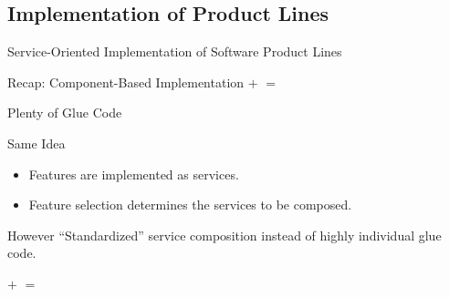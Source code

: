 \subsection{Implementation of Product Lines}
\begin{frame}{Service-Oriented Implementation of Software Product Lines}
	\begin{mycolumns}[widths={40,60},animation=none]
		\begin{example}{Recap: Component-Based Implementation}
				\vspace*{\fill}
					$+$ 
				\vspace*{\fill}	
				\vspace*{\fill}
					$=$ 
				\vspace*{\fill}	
		\end{example}	
		\begin{example}{Plenty of Glue Code}
			\centering
		\end{example}
	\mynextcolumn
		\pause
		\begin{definition}{Same Idea}
			\begin{itemize}
				\item Features are implemented as services.
				\item Feature selection determines the services to be composed.
			\end{itemize}
		\end{definition}
		\pause
		\begin{note}{However}
			``Standardized'' service composition instead of highly individual glue code.
		\end{note}
		\begin{example}{}
				\vspace*{\fill}
					$+$ 
				\vspace*{\fill}	
				\vspace*{\fill}
					$=$ 
				\vspace*{\fill}	
		\end{example}
	\end{mycolumns}	
\end{frame}

